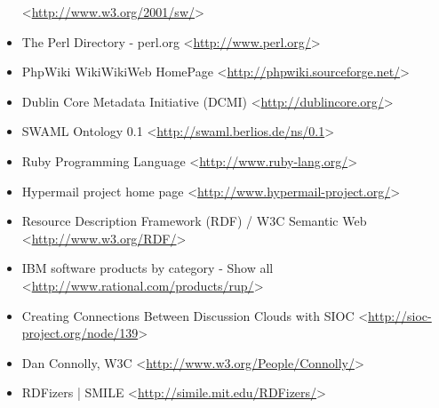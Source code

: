 \begin{itemize}
 <\url{http://www.w3.org/2001/sw/}>
 \item The Perl Directory - perl.org
 <\url{http://www.perl.org/}>
 \item PhpWiki WikiWikiWeb HomePage
 <\url{http://phpwiki.sourceforge.net/}>
 \item Dublin Core Metadata Initiative (DCMI)
 <\url{http://dublincore.org/}>
 \item SWAML Ontology 0.1
 <\url{http://swaml.berlios.de/ns/0.1}>
 \item Ruby Programming Language
 <\url{http://www.ruby-lang.org/}>
 \item Hypermail project home page
 <\url{http://www.hypermail-project.org/}>
 \item Resource Description Framework (RDF) / W3C Semantic Web
 <\url{http://www.w3.org/RDF/}>
 \item IBM software products by category - Show all
 <\url{http://www.rational.com/products/rup/}>
 \item Creating Connections Between Discussion Clouds with SIOC
 <\url{http://sioc-project.org/node/139}>
 \item Dan Connolly, W3C
 <\url{http://www.w3.org/People/Connolly/}>
 \item RDFizers | SMILE
 <\url{http://simile.mit.edu/RDFizers/}>
\end{itemize}
